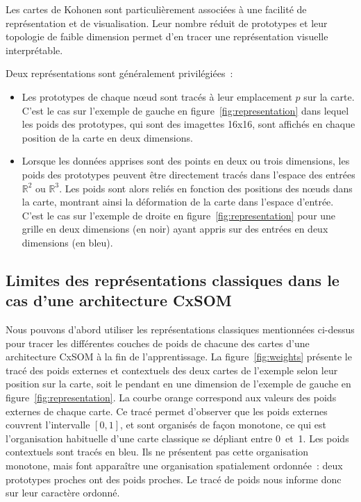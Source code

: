 \documentclass[../main]{subfiles}
\begin{document}
Les cartes de Kohonen sont particulièrement associées à une facilité de représentation et de visualisation. Leur nombre réduit de prototypes et leur topologie de faible dimension permet d'en tracer une représentation visuelle interprétable.

Deux représentations sont généralement privilégiées~:
\begin{itemize}
\item Les prototypes de chaque n\oe{}ud sont tracés à leur emplacement $p$ sur la carte. 
C'est le cas sur l'exemple de gauche en figure~\ref{fig:representation} dans lequel les poids des prototypes, qui sont des imagettes 16x16, sont affichés en chaque position de la carte en deux dimensions.
\item Lorsque les données apprises sont des points en deux ou trois dimensions, les poids des prototypes peuvent être directement tracés dans l'espace des entrées $\mathbb{R}^2$ ou $\mathbb{R}^3$. Les poids sont alors reliés en fonction des positions des n\oe{}uds dans la carte, montrant ainsi la déformation de la carte dans l'espace d'entrée. C'est le cas sur l'exemple de droite en figure~\ref{fig:representation} pour une grille en deux dimensions (en noir) ayant appris sur des entrées en deux dimensions (en bleu).
\end{itemize}



\subsection{Limites des représentations classiques dans le cas d'une architecture CxSOM}

Nous pouvons d'abord utiliser les représentations classiques mentionnées ci-dessus pour tracer les différentes couches de poids de chacune des cartes d'une architecture CxSOM à la fin de l'apprentissage.
La figure~\ref{fig:weights} présente le tracé des poids externes et contextuels des deux cartes de l'exemple selon leur position sur la carte, soit le pendant en une dimension de l'exemple de gauche en figure~\ref{fig:representation}.
La courbe orange correspond aux valeurs des poids externes de chaque carte.
Ce tracé permet d'observer que les poids externes couvrent l'intervalle $[0,1]$, et sont organisés de façon monotone, ce qui est l'organisation habituelle d'une carte classique se dépliant entre 0~et~1.
Les poids contextuels sont tracés en bleu. Ils ne présentent pas cette organisation monotone, mais font apparaître une organisation spatialement ordonnée~: deux prototypes proches ont des poids proches. Le tracé de poids nous informe donc sur leur caractère ordonné.
\end{document}
